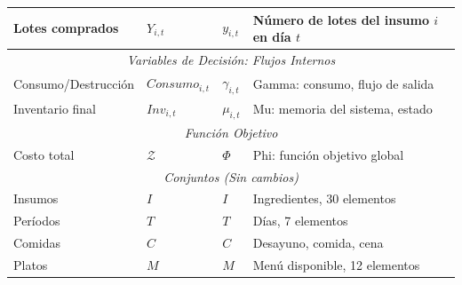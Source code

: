 \begin{table}[h]
\begin{tabular}{|l|l|l|p{6cm}|}
Lotes comprados & $Y_{i,t}$ & $y_{i,t}$ & Número de lotes del insumo $i$ en día $t$ \\
\hline
\multicolumn{4}{|c|}{\textit{Variables de Decisión: Flujos Internos}} \\
\hline
Consumo/Destrucción & $Consumo_{i,t}$ & $\gamma_{i,t}$ & Gamma: consumo, flujo de salida \\
Inventario final & $Inv_{i,t}$ & $\mu_{i,t}$ & Mu: memoria del sistema, estado \\
\hline
\multicolumn{4}{|c|}{\textit{Función Objetivo}} \\
\hline
Costo total & $\mathcal{Z}$ & $\Phi$ & Phi: función objetivo global \\
\hline
\multicolumn{4}{|c|}{\textit{Conjuntos (Sin cambios)}} \\
\hline
Insumos & $I$ & $I$ & Ingredientes, 30 elementos \\
Períodos & $T$ & $T$ & Días, 7 elementos \\
Comidas & $C$ & $C$ & Desayuno, comida, cena \\
Platos & $M$ & $M$ & Menú disponible, 12 elementos \\
\hline
\end{tabular}
\end{table}

